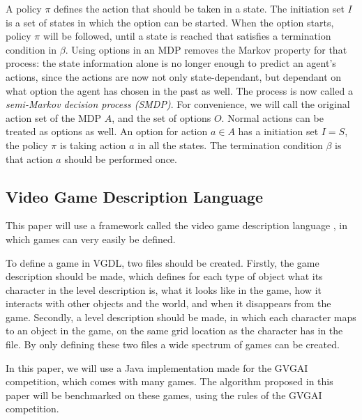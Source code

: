 A policy $\pi$ defines the action that should be taken in a state. The
initiation set $I$ is a set of states in which the option can be started. When the
option starts, policy $\pi$ will be followed, until a state is reached that
satisfies a termination condition in $\beta$. Using options in an MDP removes
the Markov property for that process: the state information alone is no longer
enough to predict an agent's actions, since the actions are now not only
state-dependant, but dependant on what option the agent has chosen in the past
as well. The process is now called a \emph{semi-Markov decision process
(SMDP)}. For convenience, we will call the original action set of the MDP $A$,
and the set of options $O$.  Normal actions can be treated as options as well.
An option for action $a \in A$ has a initiation set $I = S$, the policy $\pi$ is
taking action $a$ in all the states. The termination condition $\beta$ is that
action $a$ should be performed once.

\subsection{Video Game Description Language}
\label{subsec:vgdl}
This paper will use a framework called the video game description
language \cite{schaul2013video}, in which games can very easily be defined.

To define a game in VGDL, two files should be created. Firstly, the game
description should be made, which defines for each type of object what its
character in the level description is, what it looks like in the game, how it
interacts with other objects and the world, and when it disappears from the
game. Secondly, a level description should be made, in which each character maps
to an object in the game, on the same grid location as the character has in the
file. By only defining these two files a wide spectrum of games can be created.

In this paper, we will use a Java implementation made for the GVGAI competition,
which comes with many games. The algorithm proposed in this paper will be
benchmarked on these games, using the rules of the GVGAI competition.
